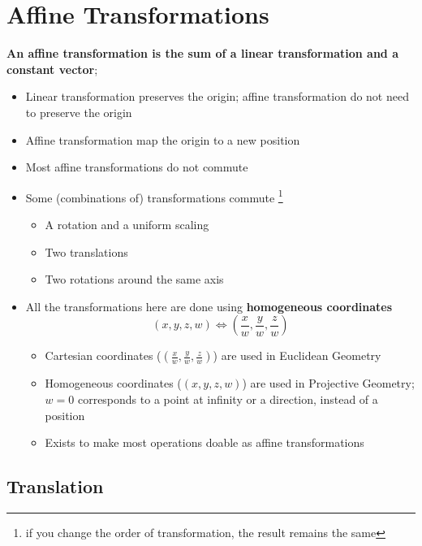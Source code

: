 \section{Affine Transformations}

\textbf{An affine transformation is the sum of a linear transformation and a
constant vector};

\begin{itemize}
  \item Linear transformation preserves the origin; affine transformation do
  not need to preserve the origin
  \item Affine transformation map the origin to a new position
  \item Most affine transformations do not commute
  \item Some (combinations of) transformations commute
  \footnote{if you change the order of transformation, the result remains the
  same}
  \begin{itemize}
    \item A rotation and a uniform scaling
    \item Two translations
    \item Two rotations around the same axis
  \end{itemize}

  \item All the transformations here are done using \textbf{homogeneous
  coordinates}
  \begin{equation}
    \left( x, y, z, w \right) \Leftrightarrow
    \left( \frac{x}{w}, \frac{y}{w}, \frac{z}{w} \right)
  \end{equation}
  \begin{itemize}
    \item Cartesian coordinates ($ \left( \frac{x}{w}, \frac{y}{w}, \frac{z}{w} \right) $)
    are used in Euclidean Geometry
    \item Homogeneous coordinates ($ \left( x, y, z, w \right) $) are used in
    Projective Geometry; $ w = 0 $ corresponds to a point at infinity or a
    direction, instead of a position
    \item Exists to make most operations doable as affine transformations
  \end{itemize}
\end{itemize}

\subsection{Translation}

